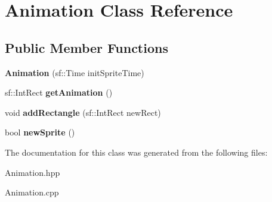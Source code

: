 \hypertarget{class_animation}{\section{Animation Class Reference}
\label{class_animation}
}
\subsection*{Public Member Functions}
\begin{DoxyCompactItemize}
\item 
\hypertarget{class_animation_a7258506ebfa4b6edbb249bb49a0ff036}{{\bfseries Animation} (sf\-::\-Time init\-Sprite\-Time)}\label{class_animation_a7258506ebfa4b6edbb249bb49a0ff036}

\item 
\hypertarget{class_animation_a379fff9002fe0d7ef80854ff5252d3ba}{sf\-::\-Int\-Rect {\bfseries get\-Animation} ()}\label{class_animation_a379fff9002fe0d7ef80854ff5252d3ba}

\item 
\hypertarget{class_animation_a9a3cc9d923251460cddd99800486c717}{void {\bfseries add\-Rectangle} (sf\-::\-Int\-Rect new\-Rect)}\label{class_animation_a9a3cc9d923251460cddd99800486c717}

\item 
\hypertarget{class_animation_a0746fa52ca85e0313398e1c3895a49f3}{bool {\bfseries new\-Sprite} ()}\label{class_animation_a0746fa52ca85e0313398e1c3895a49f3}

\end{DoxyCompactItemize}


The documentation for this class was generated from the following files\-:\begin{DoxyCompactItemize}
\item 
Animation.\-hpp\item 
Animation.\-cpp\end{DoxyCompactItemize}
